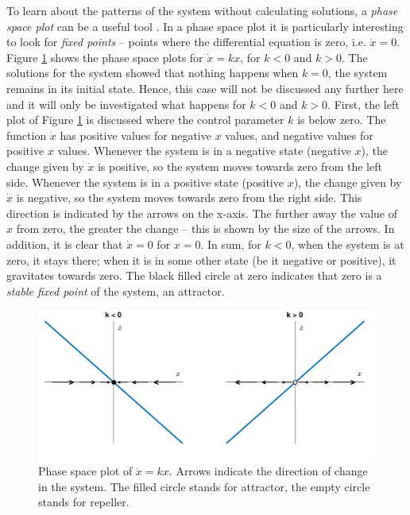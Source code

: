 To learn about the patterns of the system without calculating solutions, a \emph{phase space plot} can be a useful tool \citep{Fuchs2013}. In a phase space plot it is particularly interesting to look for \emph{fixed points} -- points where the differential equation is zero, i.e. $\dot{x} = 0$. Figure \ref{fig:phase_space_straight_line} shows the phase space plots for $\dot{x} = kx$, for $k<0$ and $k>0$. The solutions for the system showed that nothing happens when $k = 0$, the system remains in its initial state. Hence, this case will not be discussed any further here and it will only be investigated what happens for $k < 0$ and $k > 0$. First, the left plot of Figure \ref{fig:phase_space_straight_line} is discussed where the control parameter $k$ is below zero. The function $\dot{x}$ has positive values for negative $x$ values, and negative values for positive $x$ values. Whenever the system is in a negative state (negative $x$), the change given by $\dot{x}$ is positive, so the system moves towards zero from the left side. Whenever the system is in a positive state (positive $x$), the change given by $\dot{x}$ is negative, so the system moves towards zero from the right side. This direction is indicated by the arrows on the x-axis. The further away the value of $x$ from zero, the greater the change -- this is shown by the size of the arrows. In addition, it is clear that $\dot{x} = 0$ for $x=0$. In sum, for $k<0$, when the system is at zero, it stays there; when it is in some other state (be it negative or positive), it gravitates towards zero. The black filled circle at zero indicates that zero is a \emph{stable fixed point} of the system, an attractor. 

\begin{figure}[htp]
\begin{center}
\includegraphics[width=\textwidth]{figures/ch3/straight_line.pdf}
\caption[Phase space plot of $\dot{x} = kx$.]{Phase space plot of $\dot{x} = kx$. Arrows indicate the direction of change in the system. The filled circle stands for attractor, the empty circle stands for repeller.}
\label{fig:phase_space_straight_line}
\end{center}
\end{figure}

